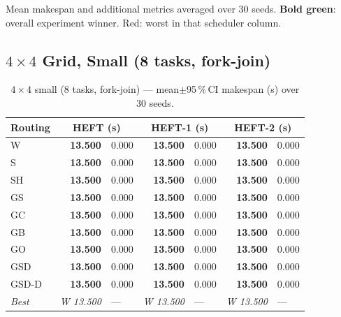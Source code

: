 \documentclass[11pt]{article}
\newcommand{\win}[1]{\textcolor{green!50!black}{\textbf{#1}}}
\newcommand{\bad}[1]{\textcolor{red!70!black}{#1}}
\begin{document}
Mean makespan and additional metrics averaged over 30 seeds.
\win{Bold green}: overall experiment winner. \bad{Red}: worst in that scheduler column.

\subsection{$4\times4$ Grid, Small (8 tasks, fork-join)}

\begin{table}[H]\centering\small
\begin{tabular}{l r@{$\pm$}l r@{$\pm$}l r@{$\pm$}l}
\toprule
\textbf{Routing} & \multicolumn{2}{c}{\textbf{HEFT (s)}} & \multicolumn{2}{c}{\textbf{HEFT-1 (s)}} & \multicolumn{2}{c}{\textbf{HEFT-2 (s)}} \\
\midrule
  W & \win{13.500} & 0.000 & \win{13.500} & 0.000 & \win{13.500} & 0.000 \\
  S & \win{13.500} & 0.000 & \win{13.500} & 0.000 & \win{13.500} & 0.000 \\
  SH & \win{13.500} & 0.000 & \win{13.500} & 0.000 & \win{13.500} & 0.000 \\
  GS & \win{13.500} & 0.000 & \win{13.500} & 0.000 & \win{13.500} & 0.000 \\
  GC & \win{13.500} & 0.000 & \win{13.500} & 0.000 & \win{13.500} & 0.000 \\
  GB & \win{13.500} & 0.000 & \win{13.500} & 0.000 & \win{13.500} & 0.000 \\
  GO & \win{13.500} & 0.000 & \win{13.500} & 0.000 & \win{13.500} & 0.000 \\
  GSD & \win{13.500} & 0.000 & \win{13.500} & 0.000 & \win{13.500} & 0.000 \\
  GSD-D & \win{13.500} & 0.000 & \win{13.500} & 0.000 & \win{13.500} & 0.000 \\
\midrule
  \textit{Best} & \textit{W 13.500} & --- & \textit{W 13.500} & --- & \textit{W 13.500} & --- \\
\bottomrule\end{tabular}
\caption{$4\times4$ small (8 tasks, fork-join) --- mean$\pm$95\,\%\,CI makespan (s) over 30 seeds.}
\end{table}
\end{document}
